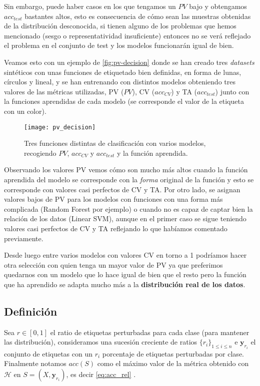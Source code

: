 Sin embargo, puede haber casos en los que tengamos un $PV$ bajo y obtengamos $acc_{test}$ bastantes altos, esto es consecuencia de cómo sean las muestras obtenidas de la distribución desconocida, si tienen alguno de los problemas que hemos mencionado (sesgo o representatividad insuficiente) entonces no se verá reflejado el problema en el conjunto de test y los modelos funcionarán igual de bien.

Veamos esto con un ejemplo de \cite{zhang2019perturbation} \autoref{fig:pv-decision} donde se han creado tres \emph{datasets} sintéticos con unas funciones de etiquetado bien definidas, en forma de lunas, círculos y lineal, y se han entrenando con distintos modelos obteniendo tres valores de las métricas utilizadas, PV ($PV$), CV ($acc_{CV}$) y TA ($acc_{test}$) junto con la funciones aprendidas de cada modelo (se corresponde el valor de la etiqueta con un color).

\begin{figure}[htpb]
  \centering
  \hspace*{-1.cm}
  \texttt{[image: pv\_decision]}
  \caption{Tres funciones distintas de clasificación con varios modelos, recogiendo $PV$, $acc_{CV}$ y $acc_{test}$ y la función aprendida.}
  \label{fig:pv-decision}
\end{figure}

Observando los valores PV vemos cómo son mucho más altos cuando la función aprendida del modelo se corresponde con la \emph{forma} original de la función y esto se corresponde con valores casi perfectos de CV y TA. Por otro lado, se asignan valores bajos de PV para los modelos con funciones con una forma más complicada (Random Forest por ejemplo) o cuando no es capaz de captar bien la relación de los datos (Linear SVM), aunque en el primer caso se sigue teniendo valores casi perfectos de CV y TA reflejando lo que habíamos comentado previamente.

Desde luego entre varios modelos con valores CV en torno a 1 podríamos hacer otra selección con quien tenga un mayor valor de PV ya que preferimos quedarnos con un modelo que lo hace igual de bien que el resto pero la función que ha aprendido se adapta mucho más a la \textbf{distribución real de los datos}.

\subsection{Definición}

Sea $r \in [0, 1]$ el ratio de etiquetas perturbadas para cada clase (para mantener las distribución), consideramos una sucesión creciente de ratios $\{r_i\}_{1 \leq i \leq n}$ e $\textbf{y}_{r_i}$ el conjunto de etiquetas con un $r_i$ porcentaje de etiquetas perturbadas por clase. Finalmente notamos $acc(S)$ como el máximo valor de la métrica obtenido con $\mathcal{H}$ en $S = (X, \textbf{y}_{r_i})$, es decir \eqref{eq:acc_rel} \cite{zhang2019perturbation}.

